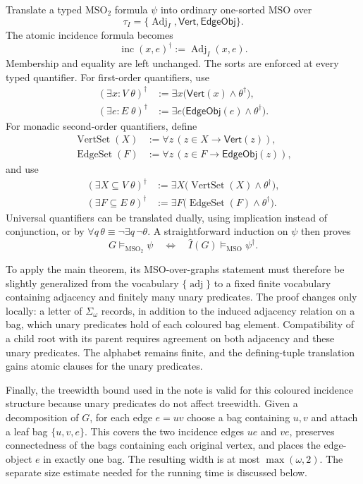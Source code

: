 \documentclass[11pt]{article}
\newcommand{\MSO}{\ensuremath{\mathrm{MSO}}}
\newcommand{\MSOtwo}{\ensuremath{\mathrm{MSO}_2}}
\begin{document}
Translate a typed \MSOtwo{} formula \(\psi\) into ordinary one-sorted \MSO{} over
\[
  \tau_I=\{\operatorname{Adj}_I,\mathsf{Vert},\mathsf{EdgeObj}\}.
\]
The atomic incidence formula becomes
\[
  \operatorname{inc}(x,e)^\dagger
  :=\operatorname{Adj}_I(x,e).
\]
Membership and equality are left unchanged.  The sorts are enforced at every
typed quantifier.  For first-order quantifiers, use
\[
\begin{aligned}
  (\exists x\!:\!V\;\theta)^\dagger
    &:=\exists x\bigl(\mathsf{Vert}(x)\wedge\theta^\dagger\bigr),\\
  (\exists e\!:\!E\;\theta)^\dagger
    &:=\exists e\bigl(\mathsf{EdgeObj}(e)\wedge\theta^\dagger\bigr).
\end{aligned}
\]
For monadic second-order quantifiers, define
\[
\begin{aligned}
  \operatorname{VertSet}(X)&:=
    \forall z\,(z\in X\to\mathsf{Vert}(z)),\\
  \operatorname{EdgeSet}(F)&:=
    \forall z\,(z\in F\to\mathsf{EdgeObj}(z)),
\end{aligned}
\]
and use
\[
\begin{aligned}
  (\exists X\!\subseteq\!V\;\theta)^\dagger
    &:=\exists X\bigl(\operatorname{VertSet}(X)\wedge\theta^\dagger\bigr),\\
  (\exists F\!\subseteq\!E\;\theta)^\dagger
    &:=\exists F\bigl(\operatorname{EdgeSet}(F)\wedge\theta^\dagger\bigr).
\end{aligned}
\]
Universal quantifiers can be translated dually, using implication instead of
conjunction, or by \(\forall q\,\theta\equiv\neg\exists q\,\neg\theta\).  A
straightforward induction on \(\psi\) then proves
\[
  G\models_{\MSOtwo}\psi
  \quad\Longleftrightarrow\quad
  \widehat I(G)\models_{\MSO}\psi^\dagger.
\]

To apply the main theorem, its MSO-over-graphs statement must therefore be
slightly generalized from the vocabulary \(\{\operatorname{adj}\}\) to a fixed
finite vocabulary containing adjacency and finitely many unary predicates.
The proof changes only locally: a letter of \(\Sigma_\omega\) records, in
addition to the induced adjacency relation on a bag, which unary predicates
hold of each coloured bag element.  Compatibility of a child root with its
parent requires agreement on both adjacency and these unary predicates.  The
alphabet remains finite, and the defining-tuple translation gains atomic
clauses for the unary predicates.

Finally, the treewidth bound used in the note is valid for this coloured
incidence structure because unary predicates do not affect treewidth.  Given a
decomposition of \(G\), for each edge \(e=uv\) choose a bag containing \(u,v\)
and attach a leaf bag \(\{u,v,e\}\).  This covers the two incidence edges
\(ue\) and \(ve\), preserves connectedness of the bags containing each original
vertex, and places the edge-object \(e\) in exactly one bag.  The resulting
width is at most \(\max(\omega,2)\).  The separate size estimate needed for the
running time is discussed below.
\end{document}
